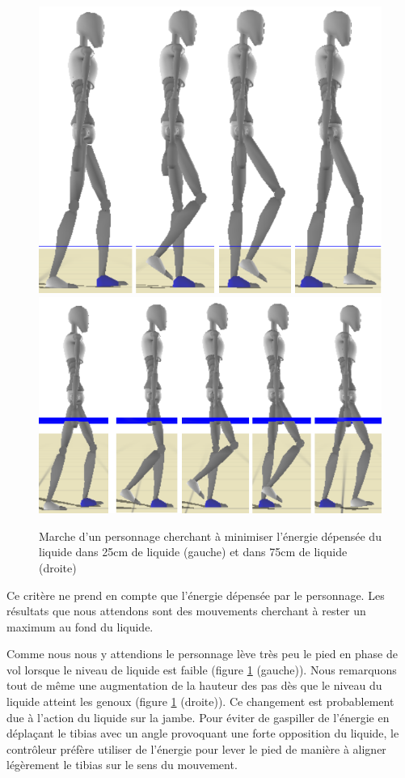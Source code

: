 \documentclass[runningheads,a4paper]{llncs}
\begin{document}
\begin{figure}[h]
\centering
\includegraphics[scale=0.3]{strips/min_torque_25cm.png}
\includegraphics[scale=0.4]{strips/min_torque_75cm.png}
\caption{Marche d'un personnage cherchant à minimiser l'énergie dépensée du liquide dans 25cm de liquide (gauche) et dans 75cm de liquide (droite)}
\label{fig:min_energ}
\end{figure}


Ce critère ne prend en compte que l'énergie dépensée par le personnage. Les résultats que nous attendons sont des mouvements cherchant à rester un maximum au fond du liquide.

Comme nous nous y attendions le personnage lève très peu le pied en phase de vol lorsque le niveau de liquide est faible (figure \ref{fig:min_energ} (gauche)). Nous remarquons tout de même une augmentation de la hauteur des pas dès que le niveau du liquide atteint les genoux (figure \ref{fig:min_energ} (droite)). Ce changement est probablement due à l'action du liquide sur la jambe. Pour éviter de gaspiller de l'énergie en déplaçant le tibias avec un angle provoquant une forte opposition du liquide, le contrôleur préfère utiliser de l'énergie pour lever le pied de manière à aligner légèrement le tibias sur le sens du mouvement. 
\end{document}
